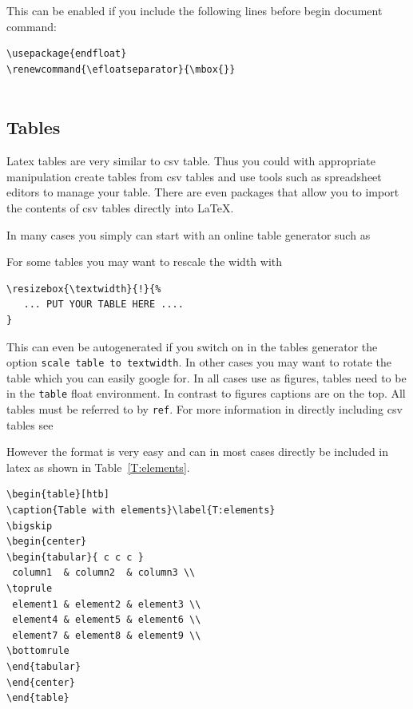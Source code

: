 This can be enabled if you include the following lines before begin
document command:

\begin{verbatim}
\usepackage{endfloat}
\renewcommand{\efloatseparator}{\mbox{}} 


\end{verbatim}

\subsection{Tables}\label{tables}

Latex tables are very similar to csv table. Thus you could with
appropriate manipulation create tables from csv tables and use tools
such as spreadsheet editors to manage your table. There are even
packages that allow you to import the contents of csv tables directly
into \LaTeX.

In many cases you simply can start with an online table generator such as


For some tables you may want to rescale the width with

\begin{verbatim}
\resizebox{\textwidth}{!}{%
   ... PUT YOUR TABLE HERE ....
}
\end{verbatim}

This can even be autogenerated if you switch on in the tables
generator the option \verb|scale table to textwidth|.
In other cases you may want to rotate the table which you can easily
google for. In all cases use as figures, tables need to be in the
\verb|table| float environment. In contrast to figures captions are on
the top. All tables must be referred to by \verb|ref|. For more
information in directly including csv tables see 


However the format is very easy and can in most cases directly be
included in latex as shown in Table~\ref{T:elements}.

\begin{verbatim}
\begin{table}[htb]
\caption{Table with elements}\label{T:elements}
\bigskip
\begin{center}
\begin{tabular}{ c c c }
 column1  & column2  & column3 \\
\toprule
 element1 & element2 & element3 \\ 
 element4 & element5 & element6 \\  
 element7 & element8 & element9 \\
\bottomrule
\end{tabular}
\end{center}
\end{table}
\end{verbatim}

